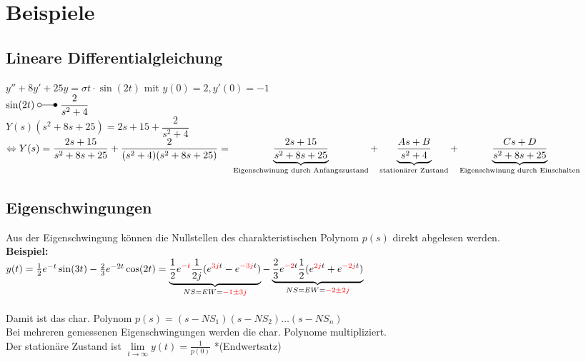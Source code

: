 \section{Beispiele}
	
	\subsection{Lineare Differentialgleichung}

		$y'' + 8y' + 25y = \sigma{t} \cdot \sin(2t)$ mit $y(0) = 2, y'(0) = -1$\\
		
		$\sin(2t) \; \laplace \; \dfrac{2}{s^2+4}$ \\ $Y(s)(s^2+8s+25) = 2s+15+\dfrac{2}{s^2+4}$
		$\Leftrightarrow Y(s) = \dfrac{2s+15}{s^2+8s+25}+\dfrac{2}{(s^2+4)(s^2+8s+25)}=\\
		\underbrace{\dfrac{2s+15}{s^2+8s+25}}_\text{Eigenschwinung durch Anfangszustand} +
		\underbrace{\dfrac{As + B}{s^2+4}}_\text{stationärer Zustand} +
		\underbrace{\dfrac{Cs + D}{s^2+8s+25}}_\text{Eigenschwinung durch Einschalten}$
		
	\subsection{Eigenschwingungen}
		Aus der Eigenschwingung können die Nullstellen des charakteristischen Polynom $p(s)$ 
		direkt abgelesen werden. \\[5mm]
		\textbf{Beispiel:} \\
		$y(t) = \frac{1}{2} e^{-t} \sin(3t) - \frac{2}{3} e^{-2t} \cos(2t) = 
		\underbrace{\frac{1}{2} e^{\textcolor{red}{-t}} \frac{1}{2j}(e^{\textcolor{red}{3j}t}
			-e^{\textcolor{red}{-3j}t})}_{NS = EW = \textcolor{red}{-1 \pm 3j}} - 
		\underbrace{\frac{2}{3} e^{\textcolor{red}{-2}t} \frac{1}{2}(e^{\textcolor{red}{2j}t}
			+e^{\textcolor{red}{-2j}t})}_{NS = EW = \textcolor{red}{-2 \pm 2j}}$ \\\\
		Damit ist das char. Polynom $p(s) = (s-NS_1)(s-NS_2)\ldots(s-NS_n)$ \\
		Bei mehreren gemessenen Eigenschwingungen werden die char. Polynome multipliziert. \\
		Der stationäre Zustand ist $\lim\limits_{t\rightarrow\infty}y(t) = \frac{1}{p(0)}$ *(Endwertsatz) \\